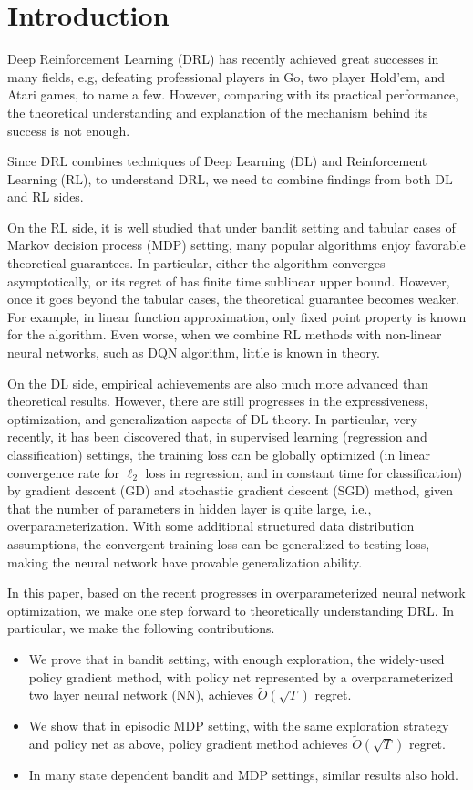 \section{Introduction}
\label{introduction}

Deep Reinforcement Learning (DRL) has recently achieved great successes in many fields, e.g, defeating professional players in Go, two player Hold'em, and Atari games, to name a few. However, comparing with its practical performance, the theoretical understanding and explanation of the mechanism behind its success is not enough.

Since DRL combines techniques of Deep Learning (DL) and Reinforcement Learning (RL), to understand DRL, we need to combine findings from both DL and RL sides.

On the RL side, it is well studied that under bandit setting and tabular cases of Markov decision process (MDP) setting, many popular algorithms enjoy favorable theoretical guarantees. In particular, either the algorithm converges asymptotically, or its regret of has finite time sublinear upper bound. However, once it goes beyond the tabular cases, the theoretical guarantee becomes weaker. For example, in linear function approximation, only fixed point property is known for the algorithm. Even worse, when we combine RL methods with non-linear neural networks, such as DQN algorithm, little is known in theory.

On the DL side, empirical achievements are also much more advanced than theoretical results. However, there are still progresses in the expressiveness, optimization, and generalization aspects of DL theory. In particular, very recently, it has been discovered that, in supervised learning (regression and classification) settings, the training loss can be globally optimized (in linear convergence rate for $\ell_2$ loss in regression, and in constant time for classification) by gradient descent (GD) and stochastic gradient descent (SGD) method, given that the number of parameters in hidden layer is quite large, i.e., overparameterization. With some additional structured data distribution assumptions, the convergent training loss can be generalized to testing loss, making the neural network have provable generalization ability. 

In this paper, based on the recent progresses in overparameterized neural network optimization, we make one step forward to theoretically understanding DRL. In particular, we make the following contributions.
\begin{itemize}
    \item We prove that in bandit setting, with enough exploration, the widely-used policy gradient method, with policy net represented by a overparameterized two layer neural network (NN), achieves $\tilde{O}\left( \sqrt{T} \right)$ regret.
    \item We show that in episodic MDP setting, with the same exploration strategy and policy net as above, policy gradient method achieves $\tilde{O}\left( \sqrt{T} \right)$ regret.
    \item In many state dependent bandit and MDP settings, similar results also hold.
\end{itemize}

